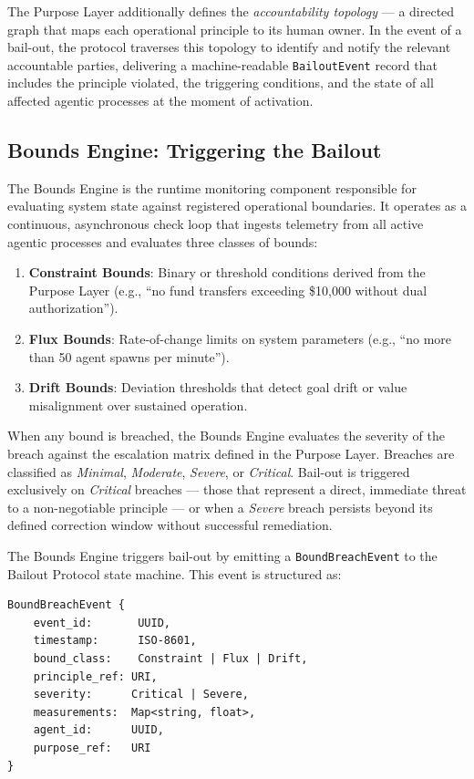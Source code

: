 The Purpose Layer additionally defines the \textit{accountability topology} — a directed graph that maps each operational principle to its human owner. In the event of a bail-out, the protocol traverses this topology to identify and notify the relevant accountable parties, delivering a machine-readable \texttt{BailoutEvent} record that includes the principle violated, the triggering conditions, and the state of all affected agentic processes at the moment of activation.

\subsection{Bounds Engine: Triggering the Bailout}
\label{sec:bounds-engine-trigger}

The Bounds Engine is the runtime monitoring component responsible for evaluating system state against registered operational boundaries. It operates as a continuous, asynchronous check loop that ingests telemetry from all active agentic processes and evaluates three classes of bounds:

\begin{enumerate}
    \item \textbf{Constraint Bounds}: Binary or threshold conditions derived from the Purpose Layer (e.g., ``no fund transfers exceeding \$10,000 without dual authorization'').
    \item \textbf{Flux Bounds}: Rate-of-change limits on system parameters (e.g., ``no more than 50 agent spawns per minute'').
    \item \textbf{Drift Bounds}: Deviation thresholds that detect goal drift or value misalignment over sustained operation.
\end{enumerate}

When any bound is breached, the Bounds Engine evaluates the severity of the breach against the escalation matrix defined in the Purpose Layer. Breaches are classified as \textit{Minimal}, \textit{Moderate}, \textit{Severe}, or \textit{Critical}. Bail-out is triggered exclusively on \textit{Critical} breaches — those that represent a direct, immediate threat to a non-negotiable principle — or when a \textit{Severe} breach persists beyond its defined correction window without successful remediation.

The Bounds Engine triggers bail-out by emitting a \texttt{BoundBreachEvent} to the Bailout Protocol state machine. This event is structured as:

\begin{verbatim}
BoundBreachEvent {
    event_id:       UUID,
    timestamp:      ISO-8601,
    bound_class:    Constraint | Flux | Drift,
    principle_ref: URI,
    severity:      Critical | Severe,
    measurements:  Map<string, float>,
    agent_id:      UUID,
    purpose_ref:   URI
}
\end{verbatim}

